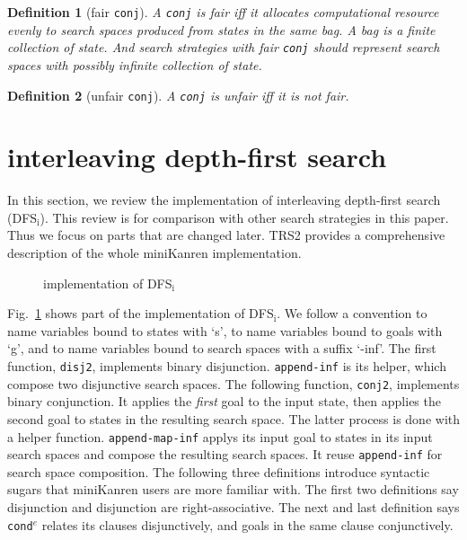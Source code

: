 \documentclass[format=acmlarge, review=true, authordraft=true]{acmart}
\newcommand{\conde}{\texttt{cond$^e$}}
\newcommand{\conj}{\texttt{conj}}
\newcommand{\DFSi }[0]{DFS$_\textrm{i}$}
\newtheorem{defn}{Definition}[section]
\begin{document}
\begin{defn}[fair \conj{}]
A \conj{} is fair iff it allocates computational resource evenly to 
search spaces produced from states in the same bag. A bag is a finite 
collection of state. And search strategies with fair \conj{} should represent 
search spaces with possibly infinite collection of state. 
\end{defn}

\begin{defn}[unfair \conj{}]
A \conj{} is unfair iff it is not fair.
\end{defn}





\section{interleaving depth-first search}

In this section, we review the implementation of interleaving depth-first 
search 
(\DFSi). This review is for comparison with other search strategies in this 
paper. Thus we focus on parts that are changed later. TRS2 
\citep{friedman_reasoned_2018} provides a comprehensive description of the 
whole miniKanren implementation.

\begin{figure}
    
    \caption{implementation of \DFSi}
    \label{DFSi}
\end{figure}

Fig.~\ref{DFSi} shows part of the implementation of \DFSi{}. We follow a
convention to name variables bound to states with `s', to name variables bound 
to goals with `g', and to name variables bound to search spaces with a suffix 
`-inf'. The first function, \texttt{disj2}, implements binary disjunction. 
\texttt{append-inf} is its helper, which compose two disjunctive search spaces. 
The following function, \texttt{conj2}, implements binary conjunction. It 
applies 
the \emph{first} goal to the input state, then applies the second goal to 
states in the resulting search space. The latter process is done with a helper 
function. \texttt{append-map-inf} applys its input goal to states in its input 
search spaces and compose the resulting search spaces. It reuse 
\texttt{append-inf} for search space composition. The following three 
definitions introduce syntactic sugars that miniKanren users are more familiar 
with. The first two definitions say disjunction and disjunction are 
right-associative. The next and last definition says \conde{} relates its 
clauses disjunctively, and goals in the same clause conjunctively.
\end{document}
